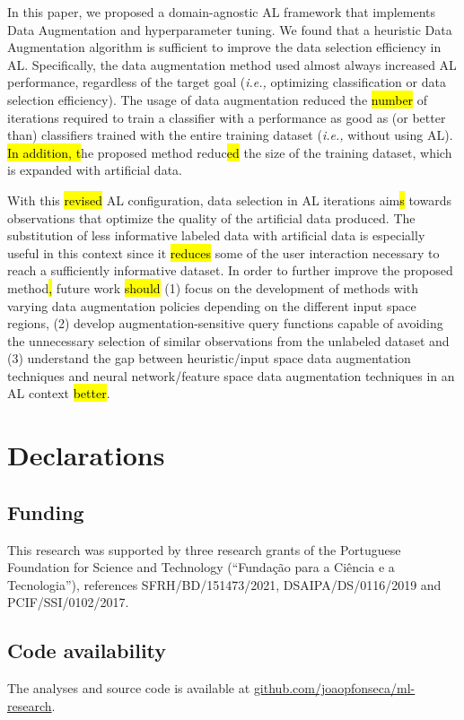 \documentclass[preprint, 12pt]{elsarticle}
\begin{document}
In this paper, we proposed a domain-agnostic AL framework that implements Data
Augmentation and hyperparameter tuning. We found that a heuristic Data
Augmentation algorithm is sufficient to improve the data selection efficiency
in AL\@. Specifically, the data augmentation method used almost always
increased AL performance, regardless of the target goal (\textit{i.e.,}
optimizing classification or data selection efficiency). The usage of data
augmentation reduced the \hl{number} of iterations required to train a
classifier with a performance as good as (or better than) classifiers trained
with the entire training dataset (\textit{i.e.,} without using AL). \hl{In
addition, t}he proposed method reduc\hl{ed} the size of the training dataset,
which is expanded with artificial data. 

With this \hl{revised} AL configuration, data selection in AL iterations aim\hl{s} towards
observations that optimize the quality of the artificial data produced. The
substitution of less informative labeled data with artificial data is
especially useful in this context since it \hl{reduces} some of
the user interaction necessary to reach a sufficiently informative dataset.
In order to further improve the proposed method\hl{,} future work \hl{should}
(1) focus on the development of methods with varying data augmentation
policies depending on the different input space regions, (2) develop
augmentation-sensitive query functions capable of avoiding the unnecessary
selection of similar observations from the unlabeled dataset and (3)
understand the gap between heuristic/input space data augmentation techniques
and neural network/feature space data augmentation techniques in an AL
context \hl{better}.

\section*{Declarations}

\subsection*{Funding}

This research was supported by three research grants of the Portuguese Foundation
for Science and Technology (``Fundação para a Ciência e a Tecnologia''),
references SFRH/BD/151473/2021, DSAIPA/DS/0116/2019 and PCIF/SSI/0102/2017.

\subsection*{Code availability}

The analyses and source code is available at
\href{https://github.com/joaopfonseca/ml-research}{github.com/joaopfonseca/ml-research}.



\end{document}
